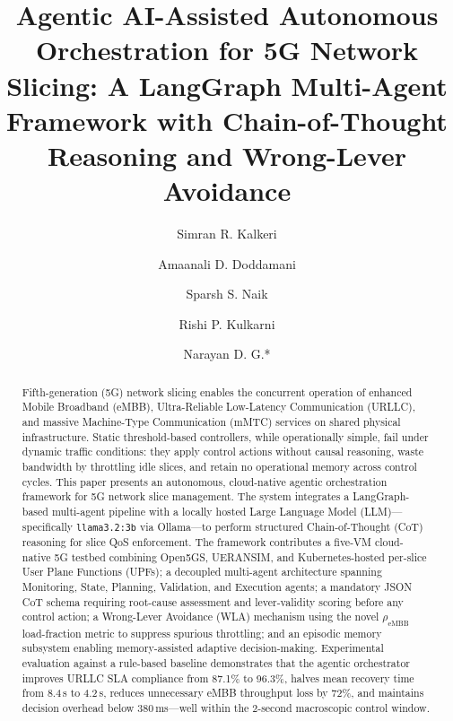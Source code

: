 \documentclass[12pt]{article}
\begin{document}
\title{\Large\bfseries Agentic AI-Assisted Autonomous Orchestration for 5G Network
Slicing: A LangGraph Multi-Agent Framework with Chain-of-Thought
Reasoning and Wrong-Lever Avoidance}

\author[1]{Simran R. Kalkeri}
\author[1]{Amaanali D. Doddamani}
\author[1]{Sparsh S. Naik}
\author[1]{Rishi P. Kulkarni}
\author[1]{Narayan D. G.*}


\date{}

\maketitle

\begin{abstract}
\noindent Fifth-generation (5G) network slicing enables the concurrent operation
of enhanced Mobile Broadband (eMBB), Ultra-Reliable Low-Latency
Communication (URLLC), and massive Machine-Type Communication (mMTC)
services on shared physical infrastructure. Static threshold-based
controllers, while operationally simple, fail under dynamic traffic
conditions: they apply control actions without causal reasoning, waste
bandwidth by throttling idle slices, and retain no operational memory
across control cycles. This paper presents an autonomous, cloud-native
agentic orchestration framework for 5G network slice management. The
system integrates a LangGraph-based multi-agent pipeline with a locally
hosted Large Language Model (LLM)---specifically \texttt{llama3.2:3b}
via Ollama---to perform structured Chain-of-Thought (CoT) reasoning for
slice QoS enforcement. The framework contributes a five-VM cloud-native
5G testbed combining Open5GS, UERANSIM, and Kubernetes-hosted per-slice
User Plane Functions (UPFs); a decoupled multi-agent architecture spanning
Monitoring, State, Planning, Validation, and Execution agents; a mandatory
JSON CoT schema requiring root-cause assessment and lever-validity scoring
before any control action; a Wrong-Lever Avoidance (WLA) mechanism using
the novel $\rho_\text{eMBB}$ load-fraction metric to suppress spurious
throttling; and an episodic memory subsystem enabling memory-assisted
adaptive decision-making. Experimental evaluation against a rule-based
baseline demonstrates that the agentic orchestrator improves URLLC SLA
compliance from 87.1\% to 96.3\%, halves mean recovery time from 8.4\,s
to 4.2\,s, reduces unnecessary eMBB throughput loss by 72\%, and maintains
decision overhead below 380\,ms---well within the 2-second macroscopic
control window.
\end{abstract}
\end{document}
